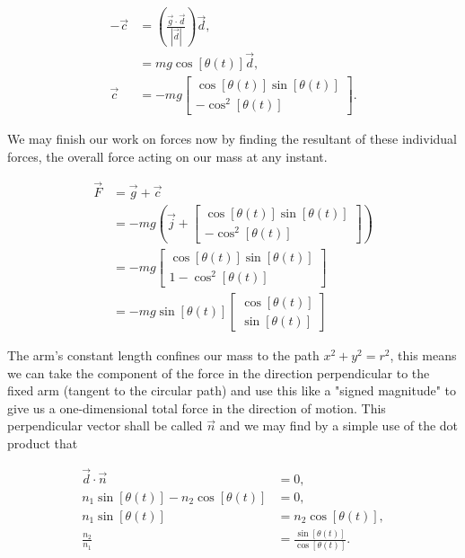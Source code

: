 \documentclass{article}
\begin{document}
\begin{align*}
	-\vec{c} &= \left(\frac{\vec{g}\cdot\vec{d}}{|\vec{d}|}\right)\vec{d}, \\
	&= mg\cos[\theta(t)]\vec{d}, \\
	\vec{c} &= -mg
	\begin{bmatrix}
		\cos[\theta(t)]\sin[\theta(t)] \\
		-\cos^2[\theta(t)]
	\end{bmatrix}
	.
\end{align*}

We may finish our work on forces now by finding the resultant of these individual forces, the overall force acting on our mass at any instant.

\begin{align*}
	\vec{F} &= \vec{g} + \vec{c} \\
	&= -mg\left(\vec{j} + 
		\begin{bmatrix}
			\cos[\theta(t)]\sin[\theta(t)] \\
			-\cos^2[\theta(t)]
		\end{bmatrix}
		\right) \\
	&= -mg
		\begin{bmatrix}
			\cos[\theta(t)]\sin[\theta(t)] \\
			1 - \cos^2[\theta(t)]
		\end{bmatrix} \\
	&= -mg\sin[\theta(t)]
		\begin{bmatrix}
			\cos[\theta(t)] \\
			\sin[\theta(t)]
		\end{bmatrix}
\end{align*}

The arm's constant length confines our mass to the path $x^2 + y^2 = r^2$, this means we can take the component of the force in the direction perpendicular to the fixed arm (tangent to the circular path) and use this like a "signed magnitude" to give us a one-dimensional total force in the direction of motion. This perpendicular vector shall be called $\vec{n}$ and we may find by a simple use of the dot product that

\begin{align*}
	\vec{d}\cdot\vec{n} &= 0, \\
	n_1\sin[\theta(t)] - n_2\cos[\theta(t)] &= 0, \\
	n_1\sin[\theta(t)] &= n_2\cos[\theta(t)], \\
	\frac{n_2}{n_1} &= \frac{\sin[\theta(t)]}{\cos[\theta(t)]}.
\end{align*}
\end{document}
